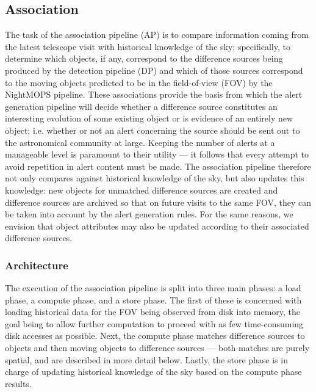 
\subsection{Association}
\label{association}

The task of the association pipeline (AP) is to compare information coming 
from the latest telescope visit with historical knowledge of the sky;
specifically, to determine which objects, if any, correspond to the difference 
sources being produced by the detection pipeline (DP) and which of those
sources correspond to the moving objects predicted to be in the field-of-view
(FOV) by the NightMOPS pipeline. These associations provide the basis from
which the alert generation pipeline will decide whether a difference source
constitutes an interesting evolution of some existing object or is evidence
of an entirely new object; i.e. whether or not an alert concerning the source
should be sent out to the astronomical community at large. Keeping the number
of alerts at a manageable level is paramount to their utility --- it follows
that every attempt to avoid repetition in alert content must be made. The
association pipeline therefore not only compares against historical knowledge
of the sky, but also updates this knowledge: new objects for unmatched
difference sources are created and difference sources are archived so that
on future visits to the same FOV, they can be taken into account by the alert
generation rules. For the same reasons, we envision that object attributes may
also be updated according to their associated difference sources.

\subsubsection{Architecture}

The execution of the association pipeline is split into three main phases: a
load phase, a compute phase, and a store phase. The first of these is
concerned with loading historical data for the FOV being observed from disk
into memory, the goal being to allow further computation to proceed with as
few time-consuming disk accesses as possible. Next, the compute phase matches
difference sources to objects and then moving objects to difference sources ---
both matches are purely spatial, and are described in more detail below.
Lastly, the store phase is in charge of updating historical knowledge of the
sky based on the compute phase results.


